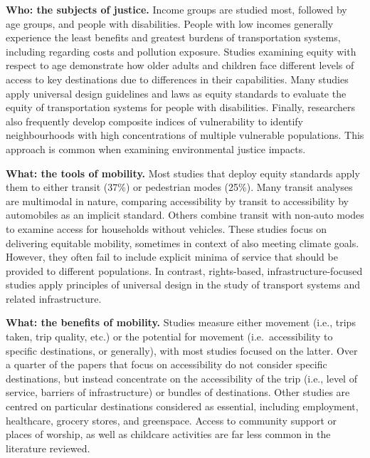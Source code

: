 \documentclass[12pt, oneside]{report}
\begin{document}
\textbf{Who: the subjects of justice.} Income groups are studied most,
followed by age groups, and people with disabilities. People with low
incomes generally experience the least benefits and greatest burdens of
transportation systems, including regarding costs and pollution
exposure. Studies examining equity with respect to age demonstrate how
older adults and children face different levels of access to key
destinations due to differences in their capabilities. Many studies
apply universal design guidelines and laws as equity standards to
evaluate the equity of transportation systems for people with
disabilities. Finally, researchers also frequently develop composite
indices of vulnerability to identify neighbourhoods with high
concentrations of multiple vulnerable populations. This approach is
common when examining environmental justice impacts.

\textbf{What: the tools of mobility.} Most studies that deploy equity
standards apply them to either transit (37\%) or pedestrian modes
(25\%). Many transit analyses are multimodal in nature, comparing
accessibility by transit to accessibility by automobiles as an implicit
standard. Others combine transit with non-auto modes to examine access
for households without vehicles. These studies focus on delivering
equitable mobility, sometimes in context of also meeting climate goals.
However, they often fail to include explicit minima of service that
should be provided to different populations. In contrast, rights-based,
infrastructure-focused studies apply principles of universal design in
the study of transport systems and related infrastructure.

\textbf{What: the benefits of mobility.} Studies measure either movement
(i.e., trips taken, trip quality, etc.) or the potential for movement
(i.e.~accessibility to specific destinations, or generally), with most
studies focused on the latter. Over a quarter of the papers that focus
on accessibility do not consider specific destinations, but instead
concentrate on the accessibility of the trip (i.e., level of service,
barriers of infrastructure) or bundles of destinations. Other studies
are centred on particular destinations considered as essential,
including employment, healthcare, grocery stores, and greenspace. Access
to community support or places of worship, as well as childcare
activities are far less common in the literature reviewed.
\end{document}
